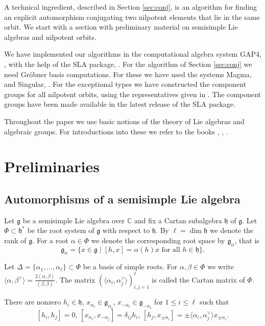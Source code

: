 \documentclass[a4paper,10pt]{amsart}
\newcommand{\C}{\mathbb{C}}
\newcommand{\mf}{\mathfrak}
\newcommand{\g}{\mf{g}}
\newcommand{\h}{\mf{h}}
\numberwithin{equation}{section}
\theoremstyle{remark}
\theoremstyle{remark}
\begin{document}
A technical ingredient, described in Section \ref{sec:conj},
is an algorithm for finding an explicit automorphism conjugating two
nilpotent elements that lie in the same orbit. We start with a section with
preliminary material on semisimple Lie algebras and nilpotent orbits.

We have implemented our algorithms in the computational algebra system
{\sf GAP}4, \cite{gap4}, with the help of the {\sf SLA} package, \cite{sla}.
For the algorithm of Section \ref{sec:conj} we need Gr\"obner basis
computations. For these we have used the systems {\sc Magma}, \cite{magma} and
{\sc Singular}, \cite{DGPS}. 
For the exceptional types we have constructed the component groups for
all nilpotent orbits, using the representatives given in \cite{gra14}.
The component groups have been made available in the latest release of
the {\sf SLA} package. 

Throughout the paper we use basic notions of the theory of Lie algebras and
algebraic groups. For introductions into these we refer to the books
\cite{borel}, \cite{hum2}, \cite{hum}.

\section{Preliminaries}\label{sec:prelim}

\subsection{Automorphisms of a semisimple Lie algebra}\label{sec:pre1}

Let $\g$ be a semisimple Lie algebra over $\C$ and fix a Cartan subalgebra
$\h$ of $\g$. Let $\Phi\subset \h^*$ be the root system of $\g$ with respect
to $\h$. By $\ell = \dim\h$ we denote the rank of $\g$.
For a root $\alpha\in \Phi$ we denote the corresponding root
space by $\g_\alpha$, that is
$$\g_\alpha = \{ x\in \g\mid [h,x]=\alpha(h)x \text{ for all } h\in \h\}.$$

Let $\Delta=\{\alpha_1,\ldots,\alpha_\ell\}\subset \Phi$ be a basis of simple
roots. For $\alpha,\beta\in \Phi$ we write $\langle \alpha,\beta^\vee\rangle=
\tfrac{2(\alpha,\beta)}{(\beta,\beta)}$. The matrix $(\langle\alpha_i,
\alpha_j^\vee\rangle)_{i,j=1}^\ell$ is called the Cartan matrix of $\Phi$.

There are nonzero $h_i\in \h$, $x_{\alpha_i} \in \g_{\alpha_i}$, $x_{-\alpha_i}\in
\g_{-\alpha_i}$ for $1\leq i\leq\ell$ such that
\begin{equation}\label{eq:cangen}
[h_i,h_j]=0,\, [x_{\alpha_i},x_{-\alpha_j}] = \delta_{ij} h_i,\,
[h_j,x_{\pm\alpha_i}] = \pm\langle \alpha_i,\alpha_j^\vee\rangle x_{\pm \alpha_i}.
\end{equation}
        
\end{document}
